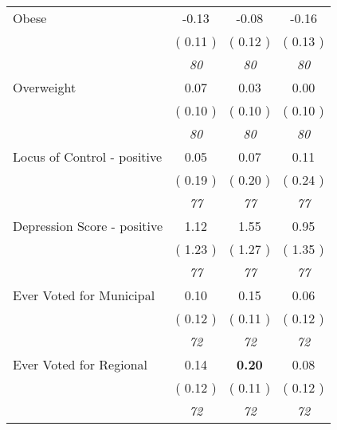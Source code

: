 \begin{tabular}{l c c c}
Obese &     -0.13 &     -0.08 &     -0.16 \\
& (     0.11 ) & (     0.12 ) & (     0.13 ) \\
& \textit{ 80 } & \textit{ 80 } & \textit{ 80 } \\
Overweight &      0.07 &      0.03 &      0.00 \\
& (     0.10 ) & (     0.10 ) & (     0.10 ) \\
& \textit{ 80 } & \textit{ 80 } & \textit{ 80 } \\
Locus of Control - positive &      0.05 &      0.07 &      0.11 \\
& (     0.19 ) & (     0.20 ) & (     0.24 ) \\
& \textit{ 77 } & \textit{ 77 } & \textit{ 77 } \\
Depression Score - positive &      1.12 &      1.55 &      0.95 \\
& (     1.23 ) & (     1.27 ) & (     1.35 ) \\
& \textit{ 77 } & \textit{ 77 } & \textit{ 77 } \\
Ever Voted for Municipal &      0.10 &      0.15 &      0.06 \\
& (     0.12 ) & (     0.11 ) & (     0.12 ) \\
& \textit{ 72 } & \textit{ 72 } & \textit{ 72 } \\
Ever Voted for Regional &      0.14 & \textbf{      0.20 } &      0.08 \\
& (     0.12 ) & (     0.11 ) & (     0.12 ) \\
& \textit{ 72 } & \textit{ 72 } & \textit{ 72 } \\
\bottomrule
\end{tabular}
